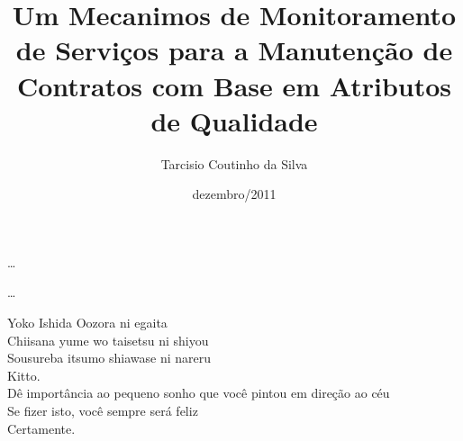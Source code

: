 \documentclass[pt,bsc,oneside,onehalfspacing]{risethesis}
\title{Um Mecanimos de Monitoramento de Serviços para a Manutenção de Contratos com Base em Atributos de Qualidade}
\date{dezembro/2011}
\author{Tarcisio Coutinho da Silva}
\begin{document}
\frontmatter
\frontpage
\presentationpage

\begin{dedicatory}
\ldots
\end{dedicatory}

\acknowledgements
\ldots

\begin{epigraph}{Yoko Ishida}
Oozora ni egaita\\
Chiisana yume wo taisetsu ni shiyou\\
Sousureba itsumo shiawase ni nareru\\
Kitto.\\
\vspace{0.5cm}
Dê importância ao pequeno sonho que você pintou em direção ao céu\\
Se fizer isto, você sempre será feliz\\
Certamente.
\vspace{0.2cm}
\end{epigraph}

\resumo


\abstract



\tableofcontents
\listoffigures
\listoftables


\mainmatter










\clearpage
\addappheadtotoc
\appendix
\appendixpage

\end{document}

